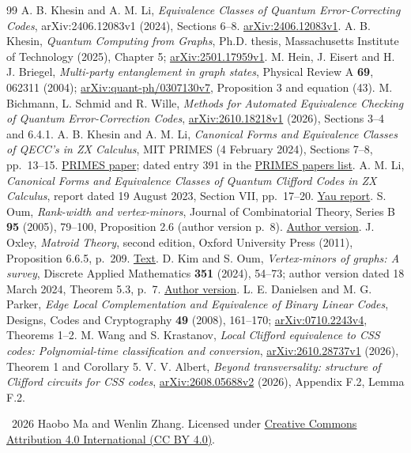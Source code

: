\documentclass[11pt]{article}
\begin{document}
\begin{thebibliography}{99}
 A. B. Khesin and A. M. Li,
\emph{Equivalence Classes of Quantum Error-Correcting Codes},
arXiv:2406.12083v1 (2024), Sections 6--8.
\href{https://arxiv.org/abs/2406.12083v1}{arXiv:2406.12083v1}.
 A. B. Khesin,
\emph{Quantum Computing from Graphs},
Ph.D. thesis, Massachusetts Institute of Technology (2025), Chapter 5;
\href{https://arxiv.org/abs/2501.17959v1}{arXiv:2501.17959v1}.
 M. Hein, J. Eisert and H. J. Briegel,
\emph{Multi-party entanglement in graph states},
Physical Review A \textbf{69}, 062311 (2004);
\href{https://arxiv.org/abs/quant-ph/0307130v7}{arXiv:quant-ph/0307130v7},
Proposition 3 and equation (43).
 M. Bichmann, L. Schmid and R. Wille,
\emph{Methods for Automated Equivalence Checking of Quantum
Error-Correction Codes},
\href{https://arxiv.org/abs/2610.18218v1}{arXiv:2610.18218v1} (2026),
Sections 3--4 and 6.4.1.
 A. B. Khesin and A. M. Li,
\emph{Canonical Forms and Equivalence Classes of QECC's in ZX Calculus},
MIT PRIMES (4 February 2024), Sections 7--8, pp.~13--15.
\href{https://math.mit.edu/research/highschool/primes/materials/2023/Khesin-Li.pdf}{PRIMES paper};
dated entry 391 in the
\href{https://math.mit.edu/research/highschool/primes/papers.html}{PRIMES papers list}.
 A. M. Li,
\emph{Canonical Forms and Equivalence Classes of Quantum Clifford Codes
in ZX Calculus}, report dated 19 August 2023, Section VII, pp.~17--20.
\href{https://www.yau-science-awards.org/upload/202311/13/202311131114411646/202311131114411646.pdf}{Yau report}.
 S. Oum, \emph{Rank-width and vertex-minors},
Journal of Combinatorial Theory, Series B \textbf{95} (2005), 79--100,
Proposition 2.6 (author version p.~8).
\href{https://mathsci.kaist.ac.kr/~sangil/pdf/vertexminor-revision.pdf}{Author version}.
 J. Oxley, \emph{Matroid Theory}, second edition,
Oxford University Press (2011), Proposition 6.6.5, p.~209.
\href{https://www.math.ens.psl.eu/~benoist/refs/Oxley.pdf}{Text}.
 D. Kim and S. Oum, \emph{Vertex-minors of graphs: A survey},
Discrete Applied Mathematics \textbf{351} (2024), 54--73;
author version dated 18 March 2024, Theorem 5.3, p.~7.
\href{https://sangil.dimag.kr/legacy/2024/03/2023vertexminors-survey-revised.pdf}{Author version}.
 L. E. Danielsen and M. G. Parker,
\emph{Edge Local Complementation and Equivalence of Binary Linear Codes},
Designs, Codes and Cryptography \textbf{49} (2008), 161--170;
\href{https://arxiv.org/abs/0710.2243v4}{arXiv:0710.2243v4}, Theorems 1--2.
 M. Wang and S. Krastanov,
\emph{Local Clifford equivalence to CSS codes: Polynomial-time classification
and conversion}, \href{https://arxiv.org/abs/2610.28737v1}{arXiv:2610.28737v1}
(2026), Theorem 1 and Corollary 5.
 V. V. Albert,
\emph{Beyond transversality: structure of Clifford circuits for CSS codes},
\href{https://arxiv.org/abs/2608.05688v2}{arXiv:2608.05688v2} (2026),
Appendix F.2, Lemma F.2.
\end{thebibliography}
\smallskip
\textcopyright\ 2026 Haobo Ma and Wenlin Zhang.
Licensed under \href{https://creativecommons.org/licenses/by/4.0/}{Creative
Commons Attribution 4.0 International (CC BY 4.0)}.
\end{document}
